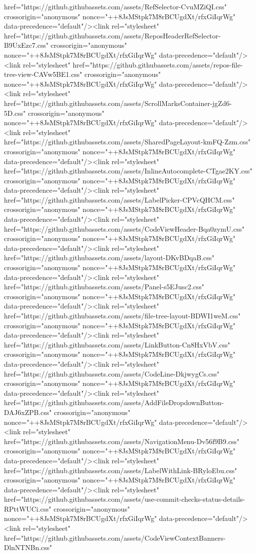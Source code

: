 href="https://github.githubassets.com/assets/RefSelector-CvuMZiQI.css" crossorigin="anonymous" nonce="++8JsMStpk7M8rBCUgdXt/rfxGiIqrWg" data-precedence="default"/><link rel="stylesheet" href="https://github.githubassets.com/assets/ReposHeaderRefSelector-B9UxEzc7.css" crossorigin="anonymous" nonce="++8JsMStpk7M8rBCUgdXt/rfxGiIqrWg" data-precedence="default"/><link rel="stylesheet" href="https://github.githubassets.com/assets/repos-file-tree-view-CAVw5BE1.css" crossorigin="anonymous" nonce="++8JsMStpk7M8rBCUgdXt/rfxGiIqrWg" data-precedence="default"/><link rel="stylesheet" href="https://github.githubassets.com/assets/ScrollMarksContainer-jgZd6-5D.css" crossorigin="anonymous" nonce="++8JsMStpk7M8rBCUgdXt/rfxGiIqrWg" data-precedence="default"/><link rel="stylesheet" href="https://github.githubassets.com/assets/SharedPageLayout-kmFQ-Zzm.css" crossorigin="anonymous" nonce="++8JsMStpk7M8rBCUgdXt/rfxGiIqrWg" data-precedence="default"/><link rel="stylesheet" href="https://github.githubassets.com/assets/InlineAutocomplete-CTgae2KY.css" crossorigin="anonymous" nonce="++8JsMStpk7M8rBCUgdXt/rfxGiIqrWg" data-precedence="default"/><link rel="stylesheet" href="https://github.githubassets.com/assets/LabelPicker-CPVcQHCM.css" crossorigin="anonymous" nonce="++8JsMStpk7M8rBCUgdXt/rfxGiIqrWg" data-precedence="default"/><link rel="stylesheet" href="https://github.githubassets.com/assets/CodeViewHeader-Bqa0zymU.css" crossorigin="anonymous" nonce="++8JsMStpk7M8rBCUgdXt/rfxGiIqrWg" data-precedence="default"/><link rel="stylesheet" href="https://github.githubassets.com/assets/layout-DKvBDqaB.css" crossorigin="anonymous" nonce="++8JsMStpk7M8rBCUgdXt/rfxGiIqrWg" data-precedence="default"/><link rel="stylesheet" href="https://github.githubassets.com/assets/Panel-s5EJusc2.css" crossorigin="anonymous" nonce="++8JsMStpk7M8rBCUgdXt/rfxGiIqrWg" data-precedence="default"/><link rel="stylesheet" href="https://github.githubassets.com/assets/file-tree-layout-BDWI1weM.css" crossorigin="anonymous" nonce="++8JsMStpk7M8rBCUgdXt/rfxGiIqrWg" data-precedence="default"/><link rel="stylesheet" href="https://github.githubassets.com/assets/LinkButton-Cn8HxVbV.css" crossorigin="anonymous" nonce="++8JsMStpk7M8rBCUgdXt/rfxGiIqrWg" data-precedence="default"/><link rel="stylesheet" href="https://github.githubassets.com/assets/CodeLine-DkjwygCs.css" crossorigin="anonymous" nonce="++8JsMStpk7M8rBCUgdXt/rfxGiIqrWg" data-precedence="default"/><link rel="stylesheet" href="https://github.githubassets.com/assets/AddFileDropdownButton-DAJ6xZPB.css" crossorigin="anonymous" nonce="++8JsMStpk7M8rBCUgdXt/rfxGiIqrWg" data-precedence="default"/><link rel="stylesheet" href="https://github.githubassets.com/assets/NavigationMenu-Dv56f9B9.css" crossorigin="anonymous" nonce="++8JsMStpk7M8rBCUgdXt/rfxGiIqrWg" data-precedence="default"/><link rel="stylesheet" href="https://github.githubassets.com/assets/LabelWithLink-BRyloEbu.css" crossorigin="anonymous" nonce="++8JsMStpk7M8rBCUgdXt/rfxGiIqrWg" data-precedence="default"/><link rel="stylesheet" href="https://github.githubassets.com/assets/use-commit-checks-status-details-RPttWUCi.css" crossorigin="anonymous" nonce="++8JsMStpk7M8rBCUgdXt/rfxGiIqrWg" data-precedence="default"/><link rel="stylesheet" href="https://github.githubassets.com/assets/CodeViewContextBanners-DlnNTNBn.css" 